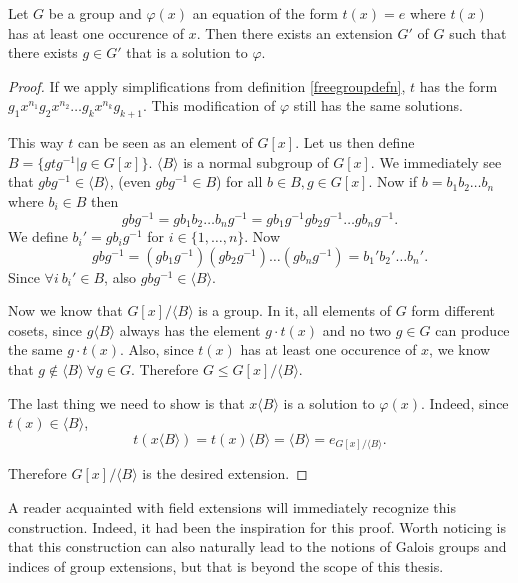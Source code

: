 \begin{thm}
	Let $G$ be a group and $\varphi(x)$ an equation of the form $t(x)=e$ where $t(x)$ has at least one occurence of $x$. Then there exists an extension $G'$ of $G$ such that there exists $g\in G'$ that is a solution to $\varphi$.
\end{thm}
\begin{proof}
If we apply simplifications from definition \autoref{freegroupdefn}, $t$ has the form $g_1 x^{n_1}g_2 x^{n_2}\dots g_k x^{n_k}g_{k+1}$. This modification of $\varphi$ still has the same solutions.

This way $t$ can be seen as an element of $G[x]$. Let us then define $B=\{gtg^{-1}|g\in G[x]\}$. $\langle B\rangle$ is a normal subgroup of $G[x]$. We immediately see that $gbg^{-1}\in \langle B\rangle$, (even $gbg^{-1}\in B$) for all $b\in B, g\in G[x]$. Now if $b=b_1 b_2\dots b_n$ where $b_i\in B$ then $$gbg^{-1}=gb_1 b_2\dots b_ng^{-1}=gb_1g^{-1}g b_2g^{-1}\dots gb_ng^{-1}.$$
We define ${b_i}'=gb_ig^{-1}$ for $i\in\{1,\dots,n\}$. Now $$gbg^{-1}=(gb_1g^{-1})(g b_2g^{-1})\dots (gb_ng^{-1})={b_1}'{b_2}'\dots{b_n}'.$$
Since $\forall i\ {b_i}'\in B$, also $gbg^{-1}\in \langle B\rangle$.

Now we know that $G[x]/\langle B \rangle$ is a group. In it, all elements of $G$ form different cosets, since $g\langle B \rangle$ always has the element $g\cdot t(x)$ and no two $g\in G$ can produce the same $g\cdot t(x)$. Also, since $t(x)$ has at least one occurence of $x$, we know that $g\notin \langle B \rangle\ \forall g\in G$. Therefore $G\leq G[x]/\langle B \rangle$.

The last thing we need to show is that $x \langle B \rangle$ is a solution to $\varphi(x)$. Indeed, since $t(x)\in\langle B \rangle$, $$t(x\langle B \rangle)=t(x)\langle B \rangle=\langle B \rangle=e_{G[x]/\langle B \rangle}.$$

Therefore $G[x]/\langle B \rangle$ is the desired extension.
\end{proof}

A reader acquainted with field extensions will immediately recognize this construction. Indeed, it had been the inspiration for this proof. Worth noticing is that this construction can also naturally lead to the notions of Galois groups and indices of group extensions, but that is beyond the scope of this thesis.


